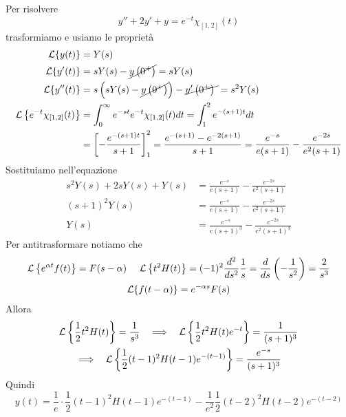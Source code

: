 Per risolvere
\begin{equation*}
y'' + 2y' + y = e^{ - t} \chi _{[ 1,2]}(t)
\end{equation*}
trasformiamo e usiamo le proprietà
\begin{align*}
\mathcal{L}\{y(t)\} & = Y(s)\\
\mathcal{L}\{y'(t)\} & = sY(s) - \cancel{y\left(0^{ + }\right)} = sY(s)\\
\mathcal{L}\{y''(t)\} & = s\left(sY(s) - \cancel{y\left(0^{ + }\right)}\right) - \cancel{y'\left(0^{ + }\right) \ } = s^{2} Y(s)\\
\mathcal{L}\left\{e^{ - t} \chi _{[ 1,2]}(t)\right\} & = \int ^{\infty }_{0} e^{ - st} e^{ - t} \chi _{[ 1,2]}(t) dt = \int ^{2}_{1} e^{ - (s + 1) t} dt\\
 & = \left[ - \frac{e^{ - (s + 1) t}}{s + 1}\right]^{2}_{1} = \frac{e^{ - (s + 1)} - e^{ - 2(s + 1)}}{s + 1} = \frac{e^{ - s}}{e(s + 1)} - \frac{e^{ - 2s}}{e^{2}(s + 1)}
\end{align*}
Sostituiamo nell'equazione
\begin{align*}
s^{2} Y(s) + 2sY(s) + Y(s) & = \frac{e^{ - s}}{e(s + 1)} - \frac{e^{ - 2s}}{e^{2}(s + 1)}\\
(s + 1)^{2} Y(s) & = \frac{e^{ - s}}{e(s + 1)} - \frac{e^{ - 2s}}{e^{2}(s + 1)}\\
Y(s) & = \frac{e^{ - s}}{e(s + 1)^{3}} - \frac{e^{ - 2s}}{e^{2}(s + 1)^{3}}
\end{align*}
Per antitrasformare notiamo che
\begin{gather*}
\Lc\left\{e^{\alpha t} f(t)\right\} = F(s - \alpha) \ \ \ \ \Lc\left\{t^{2} H(t)\right\} = (- 1)^{2}\frac{d^{2}}{ds^{2}}\frac{1}{s} = \frac{d}{ds}\left(- \frac{1}{s^{2}}\right) = \frac{2}{s^{3}}\\
\Lc\{f(t - \alpha)\} = e^{ - \alpha s} F(s)
\end{gather*}
Allora
\begin{gather*}
\mathcal{L}\left\{\frac{1}{2} t^{2} H(t)\right\} = \frac{1}{s^{3}} \ \ \implies \ \ \mathcal{L}\left\{\frac{1}{2} t^{2} H(t) e^{ - t}\right\} = \frac{1}{(s + 1)^{3}}\\
\implies \ \ \mathcal{L}\left\{\frac{1}{2}(t - 1)^{2} H(t - 1) e^{ - (t - 1)}\right\} = \frac{e^{ - s}}{(s + 1)^{3}}
\end{gather*}
Quindi
\begin{equation*}
y(t) = \frac{1}{e} \cdot \frac{1}{2}(t - 1)^{2} H(t - 1) e^{ - (t - 1)} - \frac{1}{e^{2}}\frac{1}{2}(t - 2)^{2} H(t - 2) e^{ - (t - 2)}
\end{equation*}
\Soluzione

